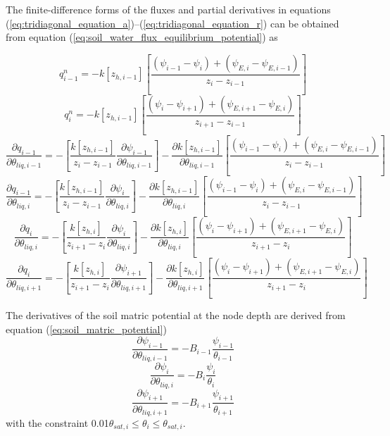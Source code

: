 \documentclass[12pt,authoryear]{elsarticle}
\numberwithin{equation}{section} %
\begin{document}
The finite-difference forms of the fluxes and partial derivatives in equations (\ref{eq:tridiagonal_equation_a})--(\ref{eq:tridiagonal_equation_r}) can be obtained from equation (\ref{eq:soil_water_flux_equilibrium_potential}) as

\begin{equation}
q_{i-1}^{n} = -k[z_{h,i-1}]\left[\frac{(\psi_{i-1}-\psi_{i})+(\psi_{E,i}-\psi_{E,i-1})}{z_{i}-z_{i-1}}\right]
\end{equation}
\begin{equation}
q_{i}^{n} = -k[z_{h,i-1}]\left[\frac{(\psi_{i}-\psi_{i+1})+(\psi_{E,i+1}-\psi_{E,i})}{z_{i+1}-z_{i-1}}\right]
\end{equation}
\begin{equation}
\frac{\partial q_{i-1}}{\partial \theta_{liq,i-1}} =-\left[\frac{k[z_{h,i-1}]}{z_{i}-z_{i-1}}\frac{\partial \psi_{i-1}}{\partial \theta_{liq,i-1}} \right]-\frac{\partial k[z_{h,i-1}]}{\partial \theta_{liq,i-1}}\left[\frac{(\psi_{i-1}-\psi_{i})+(\psi_{E,i}-\psi_{E,i-1})}{z_{i}-z_{i-1}}\right]
\end{equation}
\begin{equation}
\frac{\partial q_{i-1}}{\partial \theta_{liq,i}} =-\left[\frac{k[z_{h,i-1}]}{z_{i}-z_{i-1}}\frac{\partial \psi_{i}}{\partial \theta_{liq,i}} \right]-\frac{\partial k[z_{h,i-1}]}{\partial \theta_{liq,i}}\left[\frac{(\psi_{i-1}-\psi_{i})+(\psi_{E,i}-\psi_{E,i-1})}{z_{i}-z_{i-1}}\right]
\end{equation}
\begin{equation}
\frac{\partial q_{i}}{\partial \theta_{liq,i}} =-\left[\frac{k[z_{h,i}]}{z_{i+1}-z_{i}}\frac{\partial \psi_{i}}{\partial \theta_{liq,i}} \right]-\frac{\partial k[z_{h,i}]}{\partial \theta_{liq,i}}\left[\frac{(\psi_{i}-\psi_{i+1})+(\psi_{E,i+1}-\psi_{E,i})}{z_{i+1}-z_{i}}\right]
\end{equation}
\begin{equation}
\frac{\partial q_{i}}{\partial \theta_{liq,i+1}} =-\left[\frac{k[z_{h,i}]}{z_{i+1}-z_{i}}\frac{\partial \psi_{i+1}}{\partial \theta_{liq,i+1}} \right]-\frac{\partial k[z_{h,i}]}{\partial \theta_{liq,i+1}}\left[\frac{(\psi_{i}-\psi_{i+1})+(\psi_{E,i+1}-\psi_{E,i})}{z_{i+1}-z_{i}}\right]
\end{equation}

The derivatives of the soil matric potential at the node depth are derived from equation (\ref{eq:soil_matric_potential})
\begin{equation}
\frac{\partial \psi_{i-1}}{\partial \theta_{liq,i-1}} = -B_{i-1}\frac{\psi_{i-1}}{\theta_{i-1}}
\end{equation}
\begin{equation}
\frac{\partial \psi_{i}}{\partial \theta_{liq,i}} = -B_{i}\frac{\psi_{i}}{\theta_{i}}
\end{equation}
\begin{equation}
\frac{\partial \psi_{i+1}}{\partial \theta_{liq,i+1}} = -B_{i+1}\frac{\psi_{i+1}}{\theta_{i+1}}
\end{equation}
with the constraint 0.01$\theta_{sat,i} \leq\theta_{i}\leq\theta_{sat,i}$.
\end{document}
